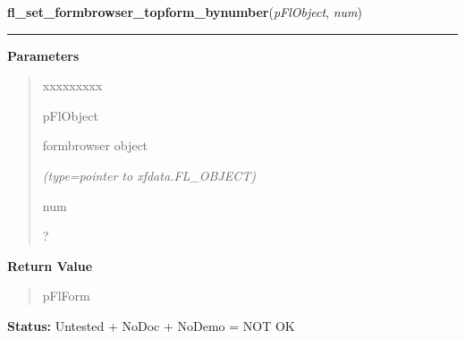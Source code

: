 \hspace{.8\funcindent}\begin{boxedminipage}{\funcwidth}

    \raggedright \textbf{fl\_set\_formbrowser\_topform\_bynumber}(\textit{pFlObject}, \textit{num})

    \vspace{-1.5ex}

    \rule{\textwidth}{0.5\fboxrule}
\setlength{\parskip}{2ex}
\setlength{\parskip}{1ex}
      \textbf{Parameters}
      \vspace{-1ex}

      \begin{quote}
        \begin{Ventry}{xxxxxxxxx}

          \item[pFlObject]

          formbrowser object

            {\it (type=pointer to xfdata.FL\_OBJECT)}

          \item[num]

          ?

        \end{Ventry}

      \end{quote}

      \textbf{Return Value}
    \vspace{-1ex}

      \begin{quote}
      pFlForm

      \end{quote}

\textbf{Status:} Untested + NoDoc + NoDemo = NOT OK



    \end{boxedminipage}

    \label{xformslib:flformbrowser:fl_set_formbrowser_xoffset}

    \vspace{0.5ex}

